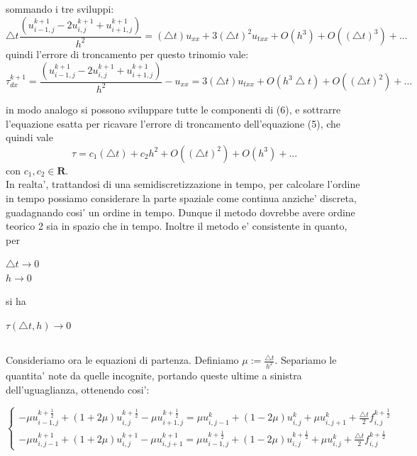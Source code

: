 \documentclass[]{article}
\begin{document}
sommando i tre sviluppi:
\begin{equation}
	\bigtriangleup t\frac{(u^{k+1}_{i-1,j} -2u^{k+1}_{i,j} + u^{k+1}_{i+1,j})}{h^2}  = (\bigtriangleup t)u_{xx} + 3(\bigtriangleup t)^2 u_{txx} + O(h^3) + O((\bigtriangleup t)^3) + ...
\end{equation}
quindi l'errore di troncamento per questo trinomio vale:
\begin{equation}
\tau^{k+1}_{dx} = \frac{(u^{k+1}_{i-1,j} -2u^{k+1}_{i,j} + u^{k+1}_{i+1,j})}{h^2}  - u_{xx} = 3(\bigtriangleup t) u_{txx} + O(
h^3 \bigtriangleup t) + O((\bigtriangleup t)^2) + ...
\end{equation}

in modo analogo si possono sviluppare tutte le componenti di (6), e sottrarre l'equazione esatta per ricavare l'errore di troncamento dell'equazione (5), che quindi vale
\begin{equation}
	\tau = c_1 (\bigtriangleup t) + c_2 h^2 + O((\bigtriangleup t)^2) + O(h^3) + ...
\end{equation}
con $c_1, c_2 \in \textbf{R}$.\\
In realta', trattandosi di una semidiscretizzazione in tempo, per calcolare l'ordine in tempo possiamo considerare la parte spaziale come continua anziche' discreta, guadagnando cosi' un ordine in tempo. Dunque il metodo dovrebbe avere ordine teorico 2 sia in spazio che in tempo.
Inoltre il metodo e' consistente in quanto, per
\begin{center}
	$\bigtriangleup t \rightarrow 0$\\
	$h \rightarrow 0$
\end{center}
si ha
\begin{center}
	$\tau (\bigtriangleup t, h) \rightarrow 0$
\end{center}

\subsection{}
Consideriamo ora le equazioni di partenza. Definiamo $\mu := \frac{\bigtriangleup t}{h^2}$. Separiamo le quantita' note da quelle incognite, portando queste ultime a sinistra dell'uguaglianza, ottenendo cosi':

\begin{equation}
	\begin{cases}
	-\mu u^{k+\frac{1}{2}}_{i-1,j} + (1+2\mu)u^{k+\frac{1}{2}}_{i,j} -\mu u^{k+\frac{1}{2}}_{i+1,j} = \mu u^{k}_{i,j-1} + (1-2\mu) u^{k}_{i,j} + \mu u^{k}_{i,j+1} + \frac{\bigtriangleup t}{2} f^{k+\frac{1}{2}}_{i,j}\\ 
	
	-\mu u^{k+1}_{i,j-1} + (1+2\mu)u^{k+1}_{i,j} -\mu u^{k+1}_{i,j+1} = \mu u^{k+\frac{1}{2}}_{i-1,j} + (1-2\mu) u^{k+\frac{1}{2}}_{i,j} + \mu u^{k}_{i,j} + \frac{\bigtriangleup t}{2} f^{k+\frac{1}{2}}_{i,j}
	
	\end{cases}
\end{equation}
\end{document}
